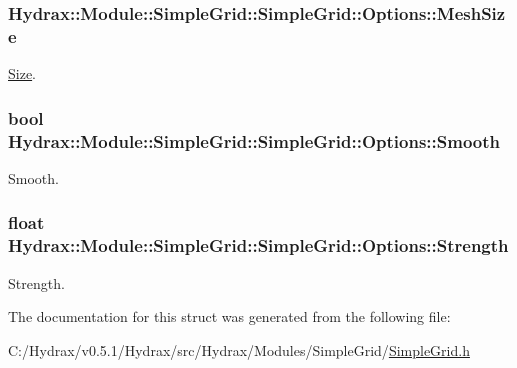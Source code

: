 \hypertarget{struct_hydrax_1_1_module_1_1_simple_grid_1_1_options_bb708bb0feb25558278a50492f593f0b}{
\subsubsection[{MeshSize}]{ Hydrax::Module::SimpleGrid::SimpleGrid::Options::MeshSize}}
\label{struct_hydrax_1_1_module_1_1_simple_grid_1_1_options_bb708bb0feb25558278a50492f593f0b}


\hyperlink{struct_hydrax_1_1_size}{Size}. 

\hypertarget{struct_hydrax_1_1_module_1_1_simple_grid_1_1_options_3b26b3400f42d6e753f5e00e7b7a8180}{
\subsubsection[{Smooth}]{\setlength{\rightskip}{0pt plus 5cm}bool Hydrax::Module::SimpleGrid::SimpleGrid::Options::Smooth}}
\label{struct_hydrax_1_1_module_1_1_simple_grid_1_1_options_3b26b3400f42d6e753f5e00e7b7a8180}


Smooth. 

\hypertarget{struct_hydrax_1_1_module_1_1_simple_grid_1_1_options_35fd961ca7eeb63127378321c6b205a0}{
\subsubsection[{Strength}]{\setlength{\rightskip}{0pt plus 5cm}float Hydrax::Module::SimpleGrid::SimpleGrid::Options::Strength}}
\label{struct_hydrax_1_1_module_1_1_simple_grid_1_1_options_35fd961ca7eeb63127378321c6b205a0}


Strength. 



The documentation for this struct was generated from the following file:\begin{CompactItemize}
\item 
C:/Hydrax/v0.5.1/Hydrax/src/Hydrax/Modules/SimpleGrid/\hyperlink{_simple_grid_8h}{SimpleGrid.h}\end{CompactItemize}
